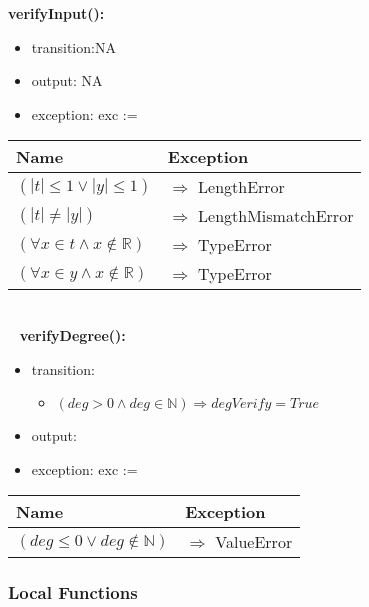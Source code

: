 \documentclass[12pt, titlepage]{article}
\begin{document}
\noindent \textbf{verifyInput():}
\begin{itemize}
\item transition:NA
\item output: NA
\item exception: exc := 
\end{itemize}

\begin{tabular}{p{12cm} p{4.75cm}}
	
	\toprule
	\textbf{Name}&\textbf{Exception}\\
	\midrule


$ (|t| \leq 1 \lor |y| \leq 1)$ & $\Rightarrow$ LengthError\\
$ (|t| \neq |y|)$ & $\Rightarrow$ LengthMismatchError\\
$ (\forall x \in t \land  x \notin \mathbb{R} )$ & $\Rightarrow$ TypeError\\
$ (\forall x \in y \land  x \notin \mathbb{R} )$ & $\Rightarrow$ TypeError\\


\bottomrule
\end{tabular}\\

~\newline
\noindent \textbf{verifyDegree():}
\begin{itemize}
	\item transition: 
	\begin{itemize}
		
		\item $(deg > 0 \land deg \in \mathbb{N})\Longrightarrow degVerify = 
		True$
	\end{itemize}
	\item output: 
	\item exception: exc := 
\end{itemize}

\begin{tabular}{p{12cm} p{4.75cm}}
	
	\toprule
	\textbf{Name}&\textbf{Exception}\\
	\midrule
	
	
	$ (deg \leq 0 \lor deg \notin \mathbb{N})$ & $\Rightarrow$ ValueError\\

	
	\bottomrule
\end{tabular}


\subsubsection{Local Functions}
\end{document}
